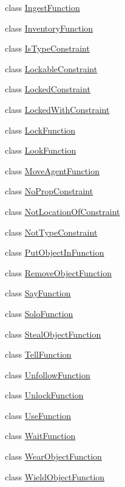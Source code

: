 \begin{DoxyCompactItemize}
\item 
class \hyperlink{classlight__chats_1_1graph_1_1IngestFunction}{Ingest\+Function}
\item 
class \hyperlink{classlight__chats_1_1graph_1_1InventoryFunction}{Inventory\+Function}
\item 
class \hyperlink{classlight__chats_1_1graph_1_1IsTypeConstraint}{Is\+Type\+Constraint}
\item 
class \hyperlink{classlight__chats_1_1graph_1_1LockableConstraint}{Lockable\+Constraint}
\item 
class \hyperlink{classlight__chats_1_1graph_1_1LockedConstraint}{Locked\+Constraint}
\item 
class \hyperlink{classlight__chats_1_1graph_1_1LockedWithConstraint}{Locked\+With\+Constraint}
\item 
class \hyperlink{classlight__chats_1_1graph_1_1LockFunction}{Lock\+Function}
\item 
class \hyperlink{classlight__chats_1_1graph_1_1LookFunction}{Look\+Function}
\item 
class \hyperlink{classlight__chats_1_1graph_1_1MoveAgentFunction}{Move\+Agent\+Function}
\item 
class \hyperlink{classlight__chats_1_1graph_1_1NoPropConstraint}{No\+Prop\+Constraint}
\item 
class \hyperlink{classlight__chats_1_1graph_1_1NotLocationOfConstraint}{Not\+Location\+Of\+Constraint}
\item 
class \hyperlink{classlight__chats_1_1graph_1_1NotTypeConstraint}{Not\+Type\+Constraint}
\item 
class \hyperlink{classlight__chats_1_1graph_1_1PutObjectInFunction}{Put\+Object\+In\+Function}
\item 
class \hyperlink{classlight__chats_1_1graph_1_1RemoveObjectFunction}{Remove\+Object\+Function}
\item 
class \hyperlink{classlight__chats_1_1graph_1_1SayFunction}{Say\+Function}
\item 
class \hyperlink{classlight__chats_1_1graph_1_1SoloFunction}{Solo\+Function}
\item 
class \hyperlink{classlight__chats_1_1graph_1_1StealObjectFunction}{Steal\+Object\+Function}
\item 
class \hyperlink{classlight__chats_1_1graph_1_1TellFunction}{Tell\+Function}
\item 
class \hyperlink{classlight__chats_1_1graph_1_1UnfollowFunction}{Unfollow\+Function}
\item 
class \hyperlink{classlight__chats_1_1graph_1_1UnlockFunction}{Unlock\+Function}
\item 
class \hyperlink{classlight__chats_1_1graph_1_1UseFunction}{Use\+Function}
\item 
class \hyperlink{classlight__chats_1_1graph_1_1WaitFunction}{Wait\+Function}
\item 
class \hyperlink{classlight__chats_1_1graph_1_1WearObjectFunction}{Wear\+Object\+Function}
\item 
class \hyperlink{classlight__chats_1_1graph_1_1WieldObjectFunction}{Wield\+Object\+Function}
\end{DoxyCompactItemize}

